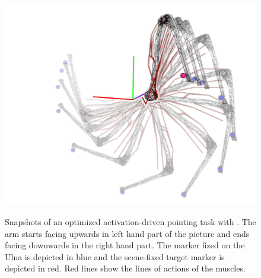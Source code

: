 %
\begin{figure}[t!]
\centering
\includegraphics[width=\columnwidth]{figures/activation_pointing.jpeg}\\
\caption{Snapshots of an optimized activation-driven pointing task with \acados. The arm starts facing upwards in left hand part of the picture and ends facing downwards in the right hand part. The marker fized on the Ulna is depicted in blue and the scene-fixed target marker is depicted in red. Red lines show the lines of actions of the muscles.}
\label{fig:snapshots_activation_driven_pointing}
\end{figure}
%









